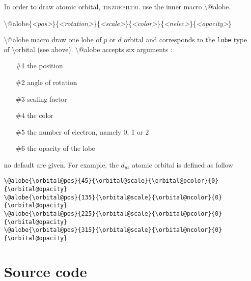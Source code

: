 \documentclass[10pt]{article}
\newcommand*{\cmd}[1]{{\ttfamily\color{blue!50!black}$\setminus$#1}\xspace}
\newcommand*{\marg}[1]{{\ttfamily\itshape\color{red!95!black}<#1>}\xspace}
\newcommand{\package}{\textsc{\sffamily\color{blue!50!black}tikzorbiltal}\xspace}
\begin{document}
In order to draw atomic orbital, \package use the inner macro \cmd{@alobe}.

\cmd{@alobe}\{\marg{pos}\}\{\marg{rotation}\}\{\marg{scale}\}\{\marg{color}\}\{\marg{nelec}\}\{\marg{opacity}\}

\cmd{@alobe} macro draw one lobe of $p$ or $d$ orbital and corresponds to the \texttt{lobe} type of \cmd{orbital} (see above). \cmd{@alobe} accepts six arguments :

\begin{enumerate}
     \item[\#1] the position
     \item[\#2] angle of rotation
     \item[\#3] scaling factor
     \item[\#4] the color
     \item[\#5] the number of electron, namely 0, 1 or 2
     \item[\#6] the opacity of the lobe
\end{enumerate}
%
no default are given. For example, the $d_{yz}$ atomic orbital is defined as follow

\begin{lstlisting}
\@alobe{\orbital@pos}{45}{\orbital@scale}{\orbital@pcolor}{0}{\orbital@opacity}   
\@alobe{\orbital@pos}{135}{\orbital@scale}{\orbital@ncolor}{0}{\orbital@opacity} 
\@alobe{\orbital@pos}{225}{\orbital@scale}{\orbital@pcolor}{0}{\orbital@opacity} 
\@alobe{\orbital@pos}{315}{\orbital@scale}{\orbital@ncolor}{0}{\orbital@opacity} 
\end{lstlisting}

\section{Source code}


\end{document}
